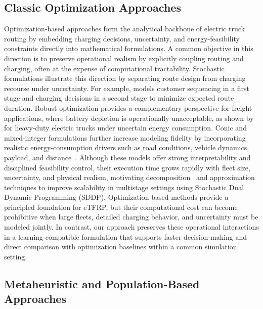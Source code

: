 \documentclass[a4paper,fleqn]{cas-sc}
\begin{document}
\subsection{Classic Optimization Approaches}

Optimization-based approaches form the analytical backbone of electric truck routing by embedding charging decisions, uncertainty, and energy-feasibility constraints directly into mathematical formulations. A common objective in this direction is to preserve operational realism by explicitly coupling routing and charging, often at the expense of computational tractability. Stochastic formulations illustrate this direction by separating route design from charging recourse under uncertainty. For example, \cite{SPINELLI2026105480} models customer sequencing in a first stage and charging decisions in a second stage to minimize expected route duration. Robust optimization provides a complementary perspective for freight applications, where battery depletion is operationally unacceptable, as shown by \cite{AMIRI2023109108} for heavy-duty electric trucks under uncertain energy consumption. Conic and mixed-integer formulations further increase modeling fidelity by incorporating realistic energy-consumption drivers such as road conditions, vehicle dynamics, payload, and distance~\citep{WANG2024123407}. Although these models offer strong interpretability and disciplined feasibility control, their execution time grows rapidly with fleet size, uncertainty, and physical realism, motivating decomposition~\citep{ziyan2025} and approximation~\cite{lara_electric_2020} techniques to improve scalability in multistage settings using Stochastic Dual Dynamic Programming (SDDP). 
Optimization-based methods provide a principled foundation for eTFRP, but their computational cost can become prohibitive when large fleets, detailed charging behavior, and uncertainty must be modeled jointly. In contrast, our approach preserves these operational interactions in a learning-compatible formulation that supports faster decision-making and direct comparison with optimization baselines within a common simulation setting.


\subsection{Metaheuristic and Population-Based Approaches}
\end{document}
